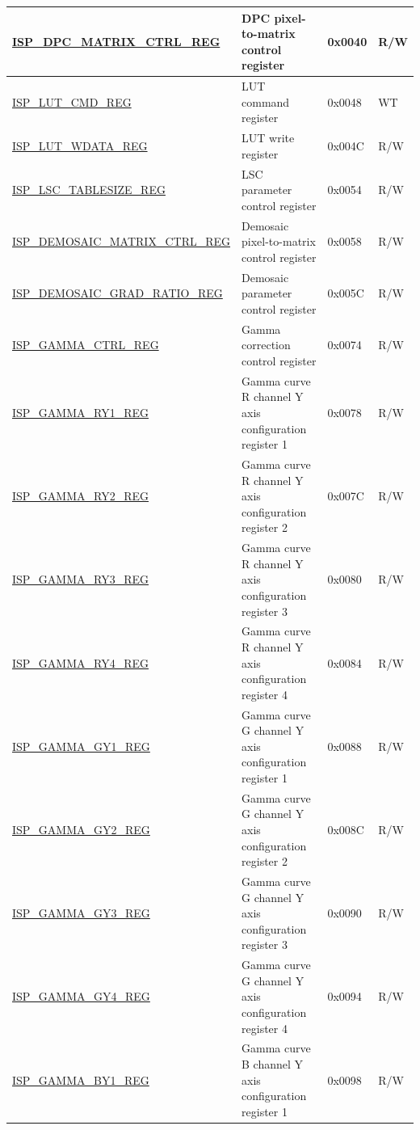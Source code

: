 \begin{longtable}{ | p{6cm} | p{7.2cm} | p{1.3cm} | p{1cm} | }
\hyperref[regdesc:ISPDPCMATRIXCTRLREG]{ISP\_DPC\_MATRIX\_CTRL\_REG} & DPC pixel-to-matrix control register & 0x0040 & R/W \\ \hline
\hyperref[regdesc:ISPLUTCMDREG]{ISP\_LUT\_CMD\_REG} & LUT command register & 0x0048 & WT \\ \hline
\hyperref[regdesc:ISPLUTWDATAREG]{ISP\_LUT\_WDATA\_REG} & LUT write register & 0x004C & R/W \\ \hline
\hyperref[regdesc:ISPLSCTABLESIZEREG]{ISP\_LSC\_TABLESIZE\_REG} & LSC parameter control register & 0x0054 & R/W \\ \hline
\hyperref[regdesc:ISPDEMOSAICMATRIXCTRLREG]{ISP\_DEMOSAIC\_MATRIX\_CTRL\_REG} & Demosaic pixel-to-matrix control register & 0x0058 & R/W \\ \hline
\hyperref[regdesc:ISPDEMOSAICGRADRATIOREG]{ISP\_DEMOSAIC\_GRAD\_RATIO\_REG} & Demosaic parameter control register & 0x005C & R/W \\ \hline
\hyperref[regdesc:ISPGAMMACTRLREG]{ISP\_GAMMA\_CTRL\_REG} & Gamma correction control register & 0x0074 & R/W \\ \hline
\hyperref[regdesc:ISPGAMMARY1REG]{ISP\_GAMMA\_RY1\_REG} & Gamma curve R channel Y axis configuration register 1 & 0x0078 & R/W \\ \hline
\hyperref[regdesc:ISPGAMMARY2REG]{ISP\_GAMMA\_RY2\_REG} & Gamma curve R channel Y axis configuration register 2 & 0x007C & R/W \\ \hline
\hyperref[regdesc:ISPGAMMARY3REG]{ISP\_GAMMA\_RY3\_REG} & Gamma curve R channel Y axis configuration register 3 & 0x0080 & R/W \\ \hline
\hyperref[regdesc:ISPGAMMARY4REG]{ISP\_GAMMA\_RY4\_REG} & Gamma curve R channel Y axis configuration register 4 & 0x0084 & R/W \\ \hline
\hyperref[regdesc:ISPGAMMAGY1REG]{ISP\_GAMMA\_GY1\_REG} & Gamma curve G channel Y axis configuration register 1 & 0x0088 & R/W \\ \hline
\hyperref[regdesc:ISPGAMMAGY2REG]{ISP\_GAMMA\_GY2\_REG} & Gamma curve G channel Y axis configuration register 2 & 0x008C & R/W \\ \hline
\hyperref[regdesc:ISPGAMMAGY3REG]{ISP\_GAMMA\_GY3\_REG} & Gamma curve G channel Y axis configuration register 3 & 0x0090 & R/W \\ \hline
\hyperref[regdesc:ISPGAMMAGY4REG]{ISP\_GAMMA\_GY4\_REG} & Gamma curve G channel Y axis configuration register 4 & 0x0094 & R/W \\ \hline
\hyperref[regdesc:ISPGAMMABY1REG]{ISP\_GAMMA\_BY1\_REG} & Gamma curve B channel Y axis configuration register 1 & 0x0098 & R/W \\ \hline

\end{longtable}
